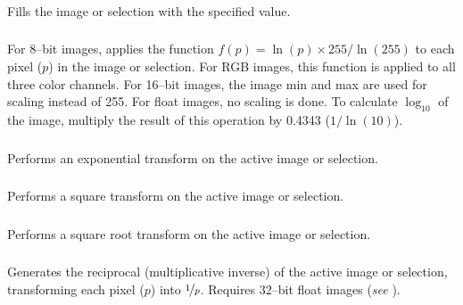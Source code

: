 \subsubsection{\protect{}\label{sub:Set...}}

Fills the image or selection with the specified value. 


\subsubsection{\protect{}\label{sub:Log}}

For 8--bit images, applies the function $f(p)=\ln(p)\times255/\ln(255)$
to each pixel ($p$) in the image or selection. For RGB images, this
function is applied to all three color channels. For 16--bit images,
the image min and max are used for scaling instead of 255. For float
images, no scaling is done. To calculate $\log_{10}$ of the image,
multiply the result of this operation by 0.4343 ($1/\ln(10)$). 


\subsubsection{\protect{}\label{sub:Exp}}

Performs an exponential transform
on the active image or selection.


\subsubsection{\protect{}\label{sub:Square}}

Performs a square transform on the active
image or selection.


\subsubsection{\protect{}\label{sub:Square-Root}}

Performs a square root transform
on the active image or selection.


\subsubsection{\protect{}\label{sub:Reciprocal}}

Generates the reciprocal (multiplicative
inverse) of the active image or selection, transforming each pixel
($p$) into $\nicefrac{1}{p}$. Requires 32--bit float images (\emph{see}
).


